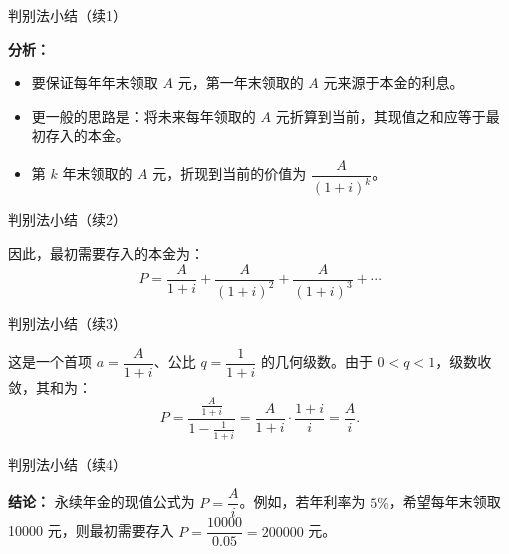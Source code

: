 \documentclass[aspectratio=169,10pt,fontset=fandol]{ctexbeamer}
\begin{document}
\begin{frame}[t,fragile]{判别法小结（续1）}
\footnotesize
{\footnotesize
\begin{application}
\textbf{分析：}
\begin{itemize}
\item 要保证每年年末领取 \(A\) 元，第一年末领取的 \(A\) 元来源于本金的利息。
\item 更一般的思路是：将未来每年领取的 \(A\) 元折算到当前，其现值之和应等于最初存入的本金。
\item 第 \(k\) 年末领取的 \(A\) 元，折现到当前的价值为 \(\dfrac{A}{(1+i)^k}\)。
\end{itemize}


\end{application}
}
\end{frame}
\begin{frame}[t,fragile]{判别法小结（续2）}
\footnotesize
{\footnotesize
\begin{application}
因此，最初需要存入的本金为：
\[
P = \frac{A}{1+i} + \frac{A}{(1+i)^2} + \frac{A}{(1+i)^3} + \cdots
\]


\end{application}
}
\end{frame}
\begin{frame}[t,fragile]{判别法小结（续3）}
\footnotesize
{\footnotesize
\begin{application}
这是一个首项 \(a=\dfrac{A}{1+i}\)、公比 \(q=\dfrac{1}{1+i}\) 的几何级数。由于 \(0<q<1\)，级数收敛，其和为：
\[
P=\frac{\frac{A}{1+i}}{1-\frac{1}{1+i}}
=\frac{A}{1+i}\cdot\frac{1+i}{i}
=\frac{A}{i}.
\]


\end{application}
}
\end{frame}
\begin{frame}[t,fragile]{判别法小结（续4）}
\footnotesize
{\footnotesize
\begin{application}
\textbf{结论：} 永续年金的现值公式为 \(P=\dfrac{A}{i}\)。例如，若年利率为 \(5\%\)，希望每年末领取 10000 元，则最初需要存入 \(P=\dfrac{10000}{0.05}=200000\) 元。


\end{application}
}
\end{frame}
\end{document}
